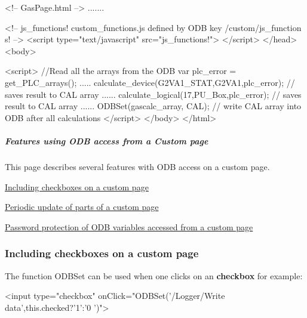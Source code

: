 \begin{DoxyCode}
<!-- GasPage.html -->
.......

<!-- js_functions!   custom_functions.js defined by  ODB key  /custom/js_function
      s!  -->
\htmlonly <script type="text/javascript"  src="js_functions!">
</script> \endhtmlonly
</head><body>


\htmlonly <script>
//Read all the arrays from the ODB
var plc_error = get_PLC_arrays();
.....
calculate_device(G2VA1_STAT,G2VA1,plc_error); // saves result to CAL array
......
calculate_logical(17,PU_Box,plc_error); // saves result to CAL array
......
ODBSet(gascalc_array, CAL); // write CAL array into ODB after all calculations
</script> \endhtmlonly
</body>
</html>
\end{DoxyCode}




\par
 \label{index_end}
\hypertarget{index_end}{}
 \subparagraph{Features using ODB access from a Custom page}\label{RC_mhttpd_custom_ODB_access_features}
\par




\par
 This page describes several features with ODB access on a custom page.


\begin{DoxyItemize}
\item \hyperlink{RC_mhttpd_custom_ODB_access_features_RC_mhttpd_custom_checkboxes}{Including checkboxes on a custom page}
\item \hyperlink{RC_mhttpd_custom_ODB_access_features_RC_mhttpd_js_update_part}{Periodic update of parts of a custom page}
\item \hyperlink{RC_mhttpd_custom_ODB_access_features_RC_mhttpd_custom_pw_protection}{Password protection of ODB variables accessed from a custom page}
\end{DoxyItemize}\hypertarget{RC_mhttpd_custom_ODB_access_features_RC_mhttpd_custom_checkboxes}{}\subsubsection{Including checkboxes on a custom page}\label{RC_mhttpd_custom_ODB_access_features_RC_mhttpd_custom_checkboxes}
The function ODBSet can be used when one clicks on an {\bfseries checkbox} for example: 
\begin{DoxyCode}
  <input type="checkbox" onClick="ODBSet('/Logger/Write data',this.checked?'1':'0
      ')">
\end{DoxyCode}


